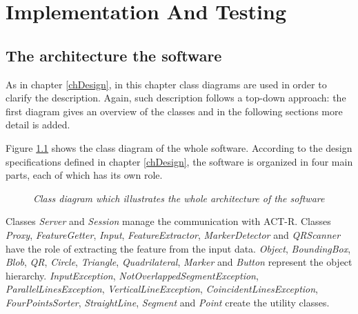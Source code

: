 \chapter{Implementation And Testing}

	\section{The architecture the software}
	As in chapter \ref{chDesign}, in this chapter class diagrams are used in order to clarify the description. Again, such description follows a top-down approach: the first diagram gives an overview of the classes and in the following sections more detail is added.

	Figure \ref{fig:implementationOnlyNames} shows the class diagram of the whole software. 
	According to the design specifications defined in chapter \ref{chDesign}, the software is organized in four main parts, each of which has its own role.

	\begin{figure}[h]
	  \begin{center} 
	  \end{center} 
	  \caption{\textit{Class diagram which illustrates the whole architecture of the software}}  
	  \label{fig:implementationOnlyNames}
 	\end{figure}
 
	Classes \emph{Server} and \emph{Session} manage the communication with \mbox{ACT-R}.
	Classes \emph{Proxy}, \emph{FeatureGetter}, \emph{Input}, \emph{FeatureExtractor}, \emph{MarkerDetector} and \emph{QRScanner} have the role of extracting the feature from the input data.
	\emph{Object}, \emph{BoundingBox}, \emph{Blob}, \emph{QR}, \emph{Circle}, \emph{Triangle}, \emph{Quadrilateral}, \emph{Marker} and \emph{Button} represent the object hierarchy.
	\emph{InputException}, \emph{NotOverlappedSegmentException}, \emph{ParallelLinesException}, \emph{VerticalLineException}, \emph{CoincidentLinesException}, \emph{FourPointsSorter}, \emph{StraightLine}, \emph{Segment} and \emph{Point} create the utility classes.
	

